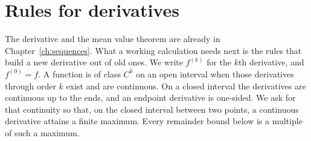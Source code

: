 
\section{Rules for derivatives}

The derivative and the mean value theorem are already in Chapter~\ref{ch:sequences}. What a working calculation needs next is the rules that build a new derivative out of old ones. We write $f^{(k)}$ for the $k$th derivative, and $f^{(0)}=f$. A function is of class $C^k$ on an open interval when those derivatives through order $k$ exist and are continuous. On a closed interval the derivatives are continuous up to the ends, and an endpoint derivative is one-sided. We ask for that continuity so that, on the closed interval between two points, a continuous derivative attains a finite maximum. Every remainder bound below is a multiple of such a maximum.

